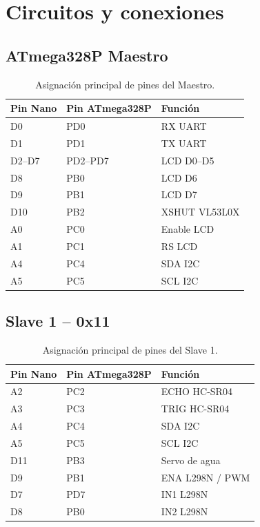 \section{Circuitos y conexiones}

\subsection{ATmega328P Maestro}
\begin{table}[H]
\centering
\small
\begin{tabular}{lll}
\toprule
Pin Nano & Pin ATmega328P & Función \\
\midrule
D0 & PD0 & RX UART \\
D1 & PD1 & TX UART \\
D2--D7 & PD2--PD7 & LCD D0--D5 \\
D8 & PB0 & LCD D6 \\
D9 & PB1 & LCD D7 \\
D10 & PB2 & XSHUT VL53L0X \\
A0 & PC0 & Enable LCD \\
A1 & PC1 & RS LCD \\
A4 & PC4 & SDA I2C \\
A5 & PC5 & SCL I2C \\
\bottomrule
\end{tabular}
\caption{Asignación principal de pines del Maestro.}
\end{table}

\subsection{Slave 1 -- 0x11}
\begin{table}[H]
\centering
\small
\begin{tabular}{lll}
\toprule
Pin Nano & Pin ATmega328P & Función \\
\midrule
A2 & PC2 & ECHO HC-SR04 \\
A3 & PC3 & TRIG HC-SR04 \\
A4 & PC4 & SDA I2C \\
A5 & PC5 & SCL I2C \\
D11 & PB3 & Servo de agua \\
D9 & PB1 & ENA L298N / PWM \\
D7 & PD7 & IN1 L298N \\
D8 & PB0 & IN2 L298N \\
\bottomrule
\end{tabular}
\caption{Asignación principal de pines del Slave 1.}
\end{table}

